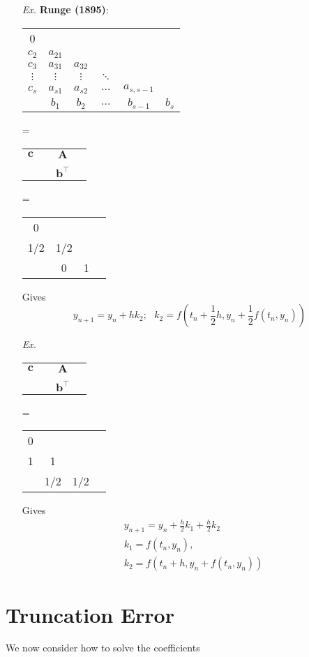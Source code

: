 \documentclass[a4paper, 11pt]{article}
\begin{document}
\begin{itemize}
	\item[\textit{Ex.}] \textbf{Runge (1895)}:
	\begin{center}
		\begin{tabular}{c|ccccc}
		0 \\
		$c_2$ & $a_{21}$ \\
		$c_3$ & $a_{31}$ & $a_{32}$\\
		$\vdots$ & $\vdots$ & $\vdots$ & $\ddots$\\
		$c_s$ & $a_{s1}$ & $a_{s2} $ & $\hdots$ & $a_{s,s-1}$\\
		\hline
		 & $b_1$ & $b_2$ & $\hdots$ & $b_{s-1}$ & $b_s$
		\end{tabular} = 
		\begin{tabular}{c|ccc}
		\\
		$\bm{c}$ &  & $\bm{A}$ \\
		 & & \\
		\hline
		 &  & $\bm{b}^{\top}$ & 
		\end{tabular} = 
		\begin{tabular}{c|ccc}
		\\
		0 &  &  \\
		1/2 & 1/2 &  \\
		\hline
		 & 0 & 1 &
		\end{tabular}
	\end{center}
	Gives
	$$
	y_{n+1} = y_n + hk_2;~~~k_2 = f\left(t_n+\frac{1}{2}h, y_n+\frac{1}{2}f(t_n, y_n)\right)
	$$
	\item[\textit{Ex.}] ~
	\begin{center}
		\begin{tabular}{c|ccc}
		\\
		$\bm{c}$ &  & $\bm{A}$ \\
		 & & \\
		\hline
		 &  & $\bm{b}^{\top}$ & 
		\end{tabular} = 
		\begin{tabular}{c|ccc}
		\\
		0 &  &  \\
		1 & 1 &  \\
		\hline
		 & 1/2 & 1/2 &
		\end{tabular}
	\end{center}
	Gives
	\begin{equation}
		\begin{split}
				&y_{n+1} = y_n + \frac{h}{2}k_1 + \frac{h}{2}k_2 \\
				&k_1=f(t_n,y_n), \\
				&k_2 = f\left(t_n+h, y_n+f(t_n, y_n)\right)
		\end{split}
	\end{equation}
\end{itemize}
\section{Truncation Error}
We now consider how to solve the coefficients 
\end{document}
